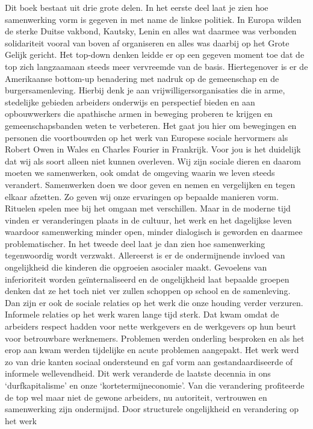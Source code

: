 \documentclass[]{book}
\begin{document}
Dit boek bestaat uit drie grote delen. In het eerste deel laat je zien
hoe samenwerking vorm is gegeven in met name de linkse politiek. In
Europa wilden de sterke Duitse vakbond, Kautsky, Lenin en alles wat
daarmee was verbonden solidariteit vooral van boven af organiseren en
alles was daarbij op het Grote Gelijk gericht. Het top-down denken
leidde er op een gegeven moment toe dat de top zich langzaamaan steeds
meer vervreemde van de basis. Hiertegenover is er de Amerikaanse
bottom-up benadering met nadruk op de gemeenschap en de
burgersamenleving. Hierbij denk je aan vrijwilligersorganisaties die in
arme, stedelijke gebieden arbeiders onderwijs en perspectief bieden en
aan opbouwwerkers die apathische armen in beweging proberen te krijgen
en gemeenschapsbanden weten te verbeteren. Het gaat jou hier om
bewegingen en personen die voortbouwden op het werk van Europese sociale
hervormers als Robert Owen in Wales en Charles Fourier in Frankrijk.
Voor jou is het duidelijk dat wij als soort alleen niet kunnen
overleven. Wij zijn sociale dieren en daarom moeten we samenwerken, ook
omdat de omgeving waarin we leven steeds verandert. Samenwerken doen we
door geven en nemen en vergelijken en tegen elkaar afzetten. Zo geven
wij onze ervaringen op bepaalde manieren vorm. Rituelen spelen mee bij
het omgaan met verschillen. Maar in de moderne tijd vinden er
veranderingen plaats in de cultuur, het werk en het dagelijkse leven
waardoor samenwerking minder open, minder dialogisch is geworden en
daarmee problematischer. In het tweede deel laat je dan zien hoe
samenwerking tegenwoordig wordt verzwakt. Allereerst is er de
ondermijnende invloed van ongelijkheid die kinderen die opgroeien
asocialer maakt. Gevoelens van inferioriteit worden geïnternaliseerd en
de ongelijkheid laat bepaalde groepen denken dat ze het toch niet ver
zullen schoppen op school en de samenleving. Dan zijn er ook de sociale
relaties op het werk die onze houding verder verzuren. Informele
relaties op het werk waren lange tijd sterk. Dat kwam omdat de arbeiders
respect hadden voor nette werkgevers en de werkgevers op hun beurt voor
betrouwbare werknemers. Problemen werden onderling besproken en als het
erop aan kwam werden tijdelijke en acute problemen aangepakt. Het werk
werd zo van drie kanten sociaal ondersteund en gaf vorm aan
gestandaardiseerde of informele wellevendheid. Dit werk veranderde de
laatste decennia in ons `durfkapitalisme' en onze
`kortetermijneconomie'. Van die verandering profiteerde de top wel maar
niet de gewone arbeiders, nu autoriteit, vertrouwen en samenwerking zijn
ondermijnd. Door structurele ongelijkheid en verandering op het werk
\end{document}
